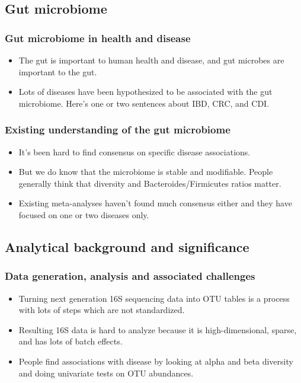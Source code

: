 \documentclass[12pt]{article}
\begin{document}
\subsection{Gut microbiome}

\subsubsection{Gut microbiome in health and disease}
\begin{itemize}
\item The gut is important to human health and disease, and gut microbes are important to the gut.
\item Lots of diseases have been hypothesized to be associated with the gut microbiome. Here's one or two sentences about IBD, CRC, and CDI.
\end{itemize}

\subsubsection{Existing understanding of the gut microbiome}

\begin{itemize}
\item It's been hard to find consensus on specific disease associations.
\item But we do know that the microbiome is stable and modifiable. People generally think that diversity and Bacteroides/Firmicutes ratios matter.
\item Existing meta-analyses haven't found much consensus either and they have focused on one or two diseases only.
\end{itemize}

\subsection{Analytical background and significance}

\subsubsection{Data generation, analysis and associated challenges} 

\begin{itemize}
\item Turning next generation 16S sequencing data into OTU tables is a process with lots of steps which are not standardized.
\item Resulting 16S data is hard to analyze because it is high-dimensional, sparse, and has lots of batch effects.
\item People find associations with disease by looking at alpha and beta diversity and doing univariate tests on OTU abundances.
\end{itemize}
\end{document}
